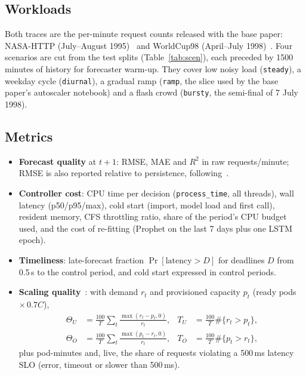 \documentclass[conference,a4paper]{IEEEtran}
\newcommand{\fitwidth}[1]{\resizebox{\ifdim\width>\linewidth\linewidth\else\width\fi}{!}{#1}}
\begin{document}
\subsection{Workloads}
Both traces are the per-minute request counts released with the base paper: NASA-HTTP (July--August
1995)~\cite{arlitt1997} and WorldCup98 (April--July 1998)~\cite{arlitt2000}. Four scenarios are cut from the test
splits (Table~\ref{tab:scen}), each preceded by 1500 minutes of history for forecaster warm-up. They cover low
noisy load (\texttt{steady}), a weekday cycle (\texttt{diurnal}), a gradual ramp (\texttt{ramp}, the slice used by
the base paper's autoscaler notebook) and a flash crowd (\texttt{bursty}, the semi-final of 7 July 1998).

\begin{table}[!t]\centering
\caption{Workload scenarios (test split only). Length in minutes; mean and max in requests/minute; CV:
coefficient of variation; p99 step: 99th percentile of the absolute minute-to-minute relative change; ACF(1):
lag-1 autocorrelation.}\label{tab:scen}
\scriptsize
\fitwidth{}
\end{table}

\subsection{Metrics}
\begin{itemize}
\item \textbf{Forecast quality} at $t{+}1$: RMSE, MAE and $R^2$ in raw requests/minute; RMSE is also reported
      relative to persistence, following~\cite{hyndman2006}.
\item \textbf{Controller cost}: CPU time per decision (\texttt{process\_time}, all threads), wall latency
      (p50/p95/max), cold start (import, model load and first call), resident memory, CFS throttling ratio, share
      of the period's CPU budget used, and the cost of re-fitting (Prophet on the last 7 days plus one LSTM
      epoch).
\item \textbf{Timeliness}: late-forecast fraction $\Pr[\text{latency}>D]$ for deadlines $D$ from 0.5\,s to the
      control period, and cold start expressed in control periods.
\item \textbf{Scaling quality}~\cite{herbst2018,dangquang2021}: with demand $r_t$ and provisioned capacity $p_t$
      (ready pods $\times\,0.7C$),
      \begin{align*}
      \Theta_U&=\tfrac{100}{T}\textstyle\sum_t \tfrac{\max(r_t-p_t,0)}{r_t}, &
      T_U&=\tfrac{100}{T}\#\{r_t>p_t\},\\
      \Theta_O&=\tfrac{100}{T}\textstyle\sum_t \tfrac{\max(p_t-r_t,0)}{r_t}, &
      T_O&=\tfrac{100}{T}\#\{p_t>r_t\},
      \end{align*}
      plus pod-minutes and, live, the share of requests violating a 500\,ms latency SLO (error, timeout or slower
      than 500\,ms).
\end{itemize}
\end{document}
